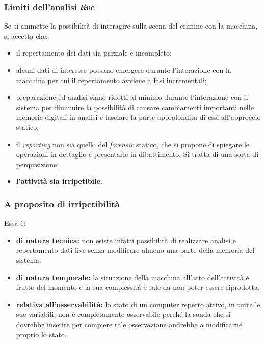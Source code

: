 \documentclass[11pt]{beamer}
\begin{document}
	\begin{frame}
		\frametitle{Limiti dell'analisi \textit{live}}
		Se si ammette la possibilità di interagire sulla scena del crimine con la macchina, si accetta che:
		\begin{itemize}
			
			\item il repertamento dei dati sia parziale e incompleto;
			
			\item alcuni dati di interesse possano emergere durante l'interazione con la macchina per cui il repertamento avviene a fasi incrementali;
			
			\item preparazione ed analisi siano ridotti al minimo durante l'interazione con il sistema per diminuire la possibilità di causare cambiamenti importanti nelle memorie digitali in analisi e lasciare la parte approfondita di essi all'approccio statico;
			
			\item il \textit{reporting} non sia quello del \textit{forensic} statico, che si propone di spiegare le operazioni in dettaglio e presentarle in dibattimento.
			Si tratta di una sorta di perquisizione;
			
			\item \textbf{l'attività sia irripetibile}.
			
		\end{itemize}
	\end{frame}
	
	\begin{frame}
		\frametitle{A proposito di irripetibilità}
		
		Essa è:
		\begin{itemize}
			
			\item \textbf{di natura tecnica:} non esiste infatti possibilità di realizzare analisi e repertamento dati live senza modificare almeno una parte della memoria del sistema.
			
			\item \textbf{di natura temporale:} la situazione della macchina all'atto dell'attività è frutto del momento e la sua complessità è tale da non poter essere riprodotta.
			
			\item \textbf{relativa all'osservabilità:} lo stato di un computer reperto attivo, in tutte le sue variabili, non è completamente osservabile perché la sonda che si dovrebbe inserire per compiere tale osservazione andrebbe a modificarne proprio lo stato.
			\end{itemize}
	\end{frame}
	
\end{document}
